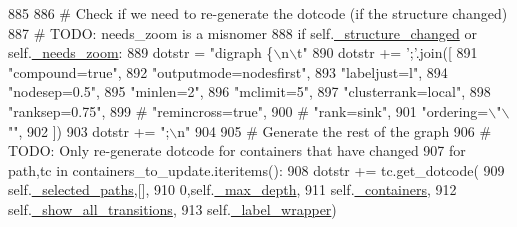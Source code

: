 \begin{DoxyCode}
885 
886                 \textcolor{comment}{# Check if we need to re-generate the dotcode (if the structure changed)}
887                 \textcolor{comment}{# TODO: needs\_zoom is a misnomer}
888                 \textcolor{keywordflow}{if} self.\hyperlink{classsmacc__viewer_1_1SmaccViewerFrame_aa5d9c77b0c46dfb7d5258d1efbcc74b0}{\_structure\_changed} \textcolor{keywordflow}{or} self.\hyperlink{classsmacc__viewer_1_1SmaccViewerFrame_a2307d88cbcee116cf8a6fa2201aedc44}{\_needs\_zoom}:
889                     dotstr = \textcolor{stringliteral}{"digraph \{\(\backslash\)n\(\backslash\)t"}
890                     dotstr += \textcolor{stringliteral}{';'}.join([
891                         \textcolor{stringliteral}{"compound=true"},
892                         \textcolor{stringliteral}{"outputmode=nodesfirst"},
893                         \textcolor{stringliteral}{"labeljust=l"},
894                         \textcolor{stringliteral}{"nodesep=0.5"},
895                         \textcolor{stringliteral}{"minlen=2"},
896                         \textcolor{stringliteral}{"mclimit=5"},
897                         \textcolor{stringliteral}{"clusterrank=local"},
898                         \textcolor{stringliteral}{"ranksep=0.75"},
899                         \textcolor{comment}{# "remincross=true",}
900                         \textcolor{comment}{# "rank=sink",}
901                         \textcolor{stringliteral}{"ordering=\(\backslash\)"\(\backslash\)""},
902                         ])
903                     dotstr += \textcolor{stringliteral}{";\(\backslash\)n"}
904 
905                     \textcolor{comment}{# Generate the rest of the graph}
906                     \textcolor{comment}{# TODO: Only re-generate dotcode for containers that have changed}
907                     \textcolor{keywordflow}{for} path,tc \textcolor{keywordflow}{in} containers\_to\_update.iteritems():
908                         dotstr += tc.get\_dotcode(
909                                 self.\hyperlink{classsmacc__viewer_1_1SmaccViewerFrame_abf24da63695ba6bd9aae3dff6e3c5aa7}{\_selected\_paths},[],
910                                 0,self.\hyperlink{classsmacc__viewer_1_1SmaccViewerFrame_acf8a98a2a2d4ae1f21e0fc3cd020b89a}{\_max\_depth},
911                                 self.\hyperlink{classsmacc__viewer_1_1SmaccViewerFrame_a00ea07c6cc068340230dcac273ad5e90}{\_containers},
912                                 self.\hyperlink{classsmacc__viewer_1_1SmaccViewerFrame_adf4d6790cc3c124fd01509f6798eeb57}{\_show\_all\_transitions},
913                                 self.\hyperlink{classsmacc__viewer_1_1SmaccViewerFrame_a839af1f1021fa7e47ccdfd63d2c56406}{\_label\_wrapper})

\end{DoxyCode}
